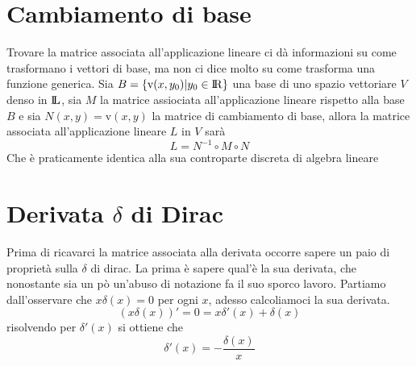 \documentclass[11pt,a4paper]{report}
\newcommand{\vettorec}[1]{\textrm{#1}}
\theoremstyle{definition}
\theoremstyle{plain}
\theoremstyle{plain}
\begin{document}
		\section{Cambiamento di base}
			Trovare la matrice associata all'applicazione lineare ci dà informazioni su come trasformano i vettori di base, ma non ci dice molto su come trasforma una funzione generica.\newline
			Sia $B=\{\vettorec v(x,y_0)|y_0\in \rm I\!R\}$ una base di uno spazio vettoriare $V$ denso in $\rm I\!L$, sia $M$ la matrice assiociata all'applicazione lineare rispetto alla base $B$ e sia $N(x,y)=\vettorec v(x,y)$ la matrice di cambiamento di base, allora la matrice associata all'applicazione lineare $L$ in $V$ sarà
			\begin{equation}
				L=N^{-1}\circ M \circ N
			\end{equation}
			Che è praticamente identica alla sua controparte discreta di algebra lineare



		\section{Derivata $\delta$ di Dirac}
			Prima di ricavarci la matrice associata alla derivata occorre sapere un paio di proprietà sulla $\delta$ di dirac.\newline
			La prima è sapere qual'è la sua derivata, che nonostante sia un pò un'abuso di notazione fa il suo sporco lavoro. Partiamo dall'osservare che $x\delta (x)=0$ per ogni $x$, adesso calcoliamoci la sua derivata.
			\[
				(x\delta (x))'=0= x\delta'(x) + \delta(x)
			\]
			risolvendo per $\delta'(x)$ si ottiene che 
			\begin{equation}
				\delta'(x)=-\frac{\delta(x)}{x}
			\end{equation}
\end{document}
